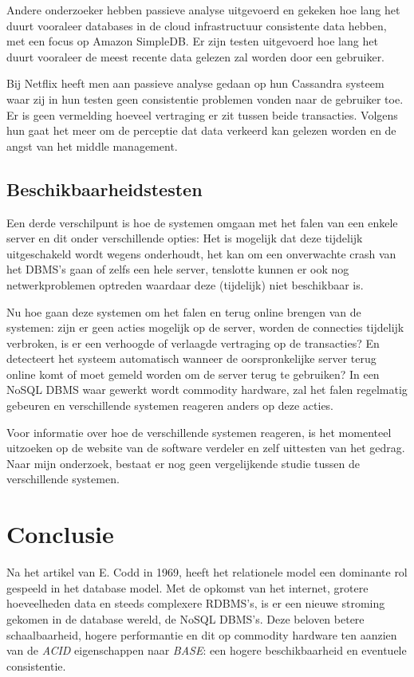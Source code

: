 Andere onderzoeker\cite{wada2011data} hebben passieve analyse uitgevoerd en gekeken hoe lang het duurt vooraleer databases in de cloud infrastructuur consistente data hebben, met een focus op Amazon SimpleDB. Er zijn testen uitgevoerd hoe lang het duurt vooraleer de meest recente data gelezen zal worden door een gebruiker. 

Bij Netflix heeft men aan passieve analyse gedaan op hun Cassandra systeem \cite{kalantzisnetflix} waar zij in hun testen geen consistentie problemen vonden naar de gebruiker toe. Er is geen vermelding hoeveel vertraging er zit tussen beide transacties. Volgens hun gaat het meer om de perceptie dat data verkeerd kan gelezen worden en de angst van het middle management. 

\subsection{Beschikbaarheidstesten}
Een derde verschilpunt is hoe de systemen omgaan met het falen van een enkele server en dit onder verschillende opties: Het is mogelijk dat deze tijdelijk uitgeschakeld wordt wegens onderhoudt, het kan om een onverwachte crash van het DBMS's gaan of zelfs een hele server, tenslotte kunnen er ook nog netwerkproblemen optreden waardaar deze (tijdelijk) niet beschikbaar is. 

Nu hoe gaan deze systemen om het falen en terug online brengen van de systemen: zijn er geen acties mogelijk op de server, worden de connecties tijdelijk verbroken, is er een verhoogde of verlaagde vertraging op de transacties? En detecteert het systeem automatisch wanneer de oorspronkelijke server terug online komt of moet gemeld worden om de server terug te gebruiken? In een NoSQL DBMS waar gewerkt wordt commodity hardware, zal het falen regelmatig gebeuren en verschillende systemen reageren anders op deze acties. 

Voor informatie over hoe de verschillende systemen reageren, is het momenteel uitzoeken op de website van de software verdeler en zelf uittesten van het gedrag. Naar mijn onderzoek, bestaat er nog geen vergelijkende studie tussen de verschillende systemen. 

\section{Conclusie}
Na het artikel van E. Codd \cite{Codd:1970:RMD:362384.362685} in 1969, heeft het relationele model een dominante rol gespeeld in het database model. Met de opkomst van het internet, grotere hoeveelheden data en steeds complexere RDBMS's, is er een nieuwe stroming gekomen in de database wereld, de NoSQL DBMS's. Deze beloven betere schaalbaarheid, hogere performantie en dit op commodity hardware ten aanzien van de \textit{ACID} eigenschappen naar \textit{BASE}: een hogere beschikbaarheid en eventuele consistentie.  

